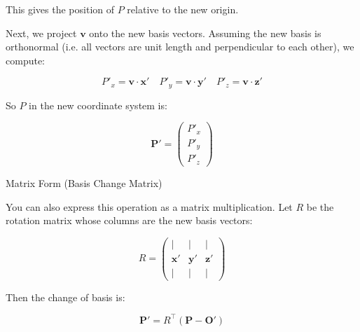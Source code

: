This gives the position of $P$ relative to the new origin.

Next, we project $\mathbf{v}$ onto the new basis vectors. Assuming the new basis
is orthonormal (i.e. all vectors are unit length and perpendicular to each other),
we compute:

\begin{equation}
    P'_x = \mathbf{v} \cdot \mathbf{x'} \quad
    P'_y = \mathbf{v} \cdot \mathbf{y'} \quad
    P'_z = \mathbf{v} \cdot \mathbf{z'}
\end{equation}

So $P$ in the new coordinate system is:

\begin{equation}
    \mathbf{P'} = \begin{pmatrix} P'_x \\ P'_y \\ P'_z \end{pmatrix}
\end{equation}

Matrix Form (Basis Change Matrix)

You can also express this operation as a matrix multiplication. Let
$R$ be the rotation matrix whose columns are the new basis vectors:

\begin{equation}
    R = \begin{pmatrix}
        |           & |           & |           \\
        \mathbf{x'} & \mathbf{y'} & \mathbf{z'} \\
        |           & |           & |
    \end{pmatrix}
\end{equation}

Then the change of basis is:

\begin{equation}
    \mathbf{P'} = R^\top (\mathbf{P} - \mathbf{O'})
\end{equation}